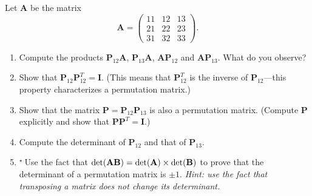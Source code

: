 \documentclass[11pt,a4paper]{article}
\def\bA{\mathbf{A}}
\def\bB{\mathbf{B}}
\def\bI{\mathbf{I}}
\def\bP{\mathbf{P}}
\def\tough{$\!\!\!{}^\star\>$}
\begin{document}
\begin{enumerate}
Let $\bA$ be the matrix
$$  \bA =  \left ( \begin{array}{ccc}  11 & 12 & 13\\  21 & 22 & 23 \\  31 & 32 & 33 \end{array} \right ).$$
\begin{enumerate}
\item Compute the products $\bP_{12} \bA$,  $\bP_{13} \bA$,   $\bA\bP_{12}$ and  $\bA\bP_{13}$.
What do you observe?
\item  Show that  $\bP_{12} \bP_{12}^T = \bI$.  (This means that $\bP_{12}^T$ is the inverse of   $\bP_{12}$---this
property characterizes a  permutation matrix.)
\item Show that the matrix $\bP= \bP_{12} \bP_{13} $ is also a permutation matrix. (Compute $\bP$
explicitly  and show that $\bP \bP^T=\bI$.)
\item Compute  the determinant of $\bP_{12}$ and that of $\bP_{13}$.
\item\tough Use the fact that  $\hbox{det}(\bA \bB) =  \hbox{det}(\bA) \times \hbox{det}(\bB)$ to
prove that the determinant of a permutation matrix is $\pm 1$. \emph{Hint: 
use the fact that transposing a matrix does not change its determinant.}


\end{enumerate}
%


\end{enumerate}
\vfill\eject
\end{document}
